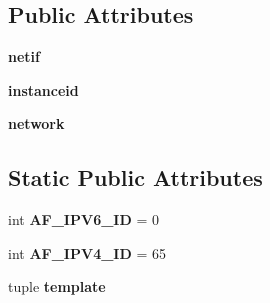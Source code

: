 \subsection*{Public Attributes}
\begin{DoxyCompactItemize}
\item 
\hypertarget{classcore_1_1misc_1_1quagga_1_1_quagga_o_s_p_f6_interface_a7c6cbfe8e156ad3854a129490e480488}{{\bfseries netif}}\label{classcore_1_1misc_1_1quagga_1_1_quagga_o_s_p_f6_interface_a7c6cbfe8e156ad3854a129490e480488}

\item 
\hypertarget{classcore_1_1misc_1_1quagga_1_1_quagga_o_s_p_f6_interface_a00296e60e58da3bbd9a05a31ac79ee32}{{\bfseries instanceid}}\label{classcore_1_1misc_1_1quagga_1_1_quagga_o_s_p_f6_interface_a00296e60e58da3bbd9a05a31ac79ee32}

\item 
\hypertarget{classcore_1_1misc_1_1quagga_1_1_quagga_o_s_p_f6_interface_a02472e9940efcfe4feb85574acf813ae}{{\bfseries network}}\label{classcore_1_1misc_1_1quagga_1_1_quagga_o_s_p_f6_interface_a02472e9940efcfe4feb85574acf813ae}

\end{DoxyCompactItemize}
\subsection*{Static Public Attributes}
\begin{DoxyCompactItemize}
\item 
\hypertarget{classcore_1_1misc_1_1quagga_1_1_quagga_o_s_p_f6_interface_a5e27eb4a5fceaf988dc7fea415408f12}{int {\bfseries A\+F\+\_\+\+I\+P\+V6\+\_\+\+I\+D} = 0}\label{classcore_1_1misc_1_1quagga_1_1_quagga_o_s_p_f6_interface_a5e27eb4a5fceaf988dc7fea415408f12}

\item 
\hypertarget{classcore_1_1misc_1_1quagga_1_1_quagga_o_s_p_f6_interface_a4eddd0920c2da7f772d4ed2e672d5a10}{int {\bfseries A\+F\+\_\+\+I\+P\+V4\+\_\+\+I\+D} = 65}\label{classcore_1_1misc_1_1quagga_1_1_quagga_o_s_p_f6_interface_a4eddd0920c2da7f772d4ed2e672d5a10}

\item 
tuple {\bfseries template}
\end{DoxyCompactItemize}


